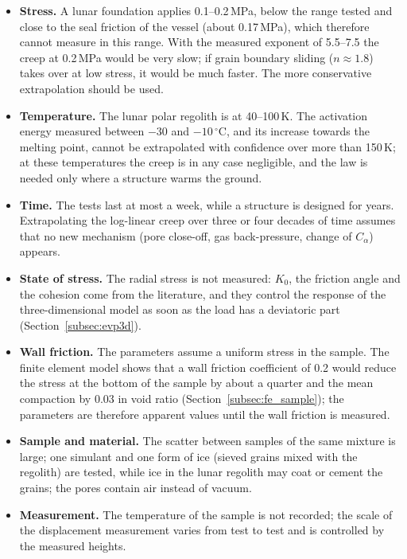 \begin{itemize}
    \item \textbf{Stress.} A lunar foundation applies 0.1--0.2\,MPa, below the range tested and close to the seal friction of the vessel (about 0.17\,MPa), which therefore cannot measure in this range. With the measured exponent of 5.5--7.5 the creep at 0.2\,MPa would be very slow; if grain boundary sliding ($n\approx1.8$) takes over at low stress, it would be much faster. The more conservative extrapolation should be used.
    \item \textbf{Temperature.} The lunar polar regolith is at 40--100\,K. The activation energy measured between $-30$ and $-10\,^\circ$C, and its increase towards the melting point, cannot be extrapolated with confidence over more than 150\,K; at these temperatures the creep is in any case negligible, and the law is needed only where a structure warms the ground.
    \item \textbf{Time.} The tests last at most a week, while a structure is designed for years. Extrapolating the log-linear creep over three or four decades of time assumes that no new mechanism (pore close-off, gas back-pressure, change of $C_\alpha$) appears.
    \item \textbf{State of stress.} The radial stress is not measured: $K_0$, the friction angle and the cohesion come from the literature, and they control the response of the three-dimensional model as soon as the load has a deviatoric part (Section~\ref{subsec:evp3d}).
    \item \textbf{Wall friction.} The parameters assume a uniform stress in the sample. The finite element model shows that a wall friction coefficient of 0.2 would reduce the stress at the bottom of the sample by about a quarter and the mean compaction by 0.03 in void ratio (Section~\ref{subsec:fe_sample}); the parameters are therefore apparent values until the wall friction is measured.
    \item \textbf{Sample and material.} The scatter between samples of the same mixture is large; one simulant and one form of ice (sieved grains mixed with the regolith) are tested, while ice in the lunar regolith may coat or cement the grains; the pores contain air instead of vacuum.
    \item \textbf{Measurement.} The temperature of the sample is not recorded; the scale of the displacement measurement varies from test to test and is controlled by the measured heights.
\end{itemize}

